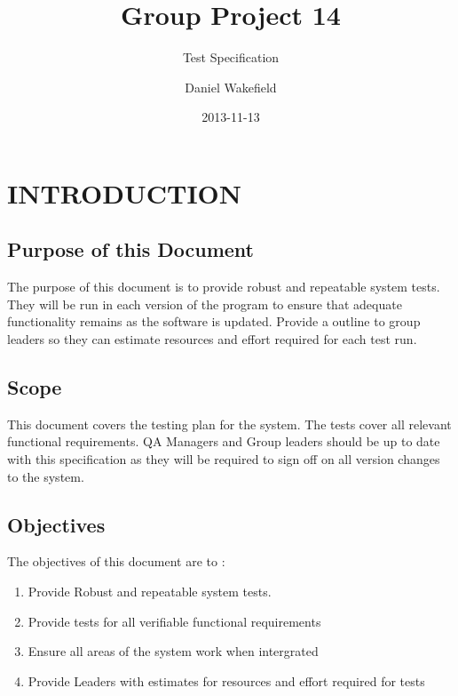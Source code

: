 \documentclass{project}
\begin{document}
\title{Group Project 14}

\subtitle{Test Specification}
\author{Daniel Wakefield}
\date{2013-11-13}

\maketitle
\tableofcontents
\newpage


\section{INTRODUCTION}

\subsection{Purpose of this Document}
The purpose of this document is to provide robust and repeatable system tests.
They will be run in each version of the program to ensure that adequate 
functionality remains as the software is updated. Provide a outline to 
group leaders so they can estimate resources and effort required for each test
run.


\subsection{Scope}
This document covers the testing plan for the system. The tests cover all relevant functional requirements. QA Managers and Group leaders should be
up to date with this specification as they will be required to sign off
on all version changes to the system.


\subsection{Objectives}
The objectives of this document are to :
\begin{enumerate}
\item Provide Robust and repeatable system tests.
\item Provide tests for all verifiable functional requirements
\item Ensure all areas of the system work when intergrated
\item Provide Leaders with estimates for resources and effort required
for tests

\end {enumerate}
\end{document}
